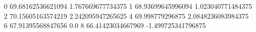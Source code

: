 0 69.68162536621094 1.767669677734375
1 68.93699645996094 1.023040771484375
2 70.15605163574219 2.242095947265625
4 69.998779296875 2.0848236083984375
6 67.91395568847656 0.0
8 66.41423034667969 -1.499725341796875
